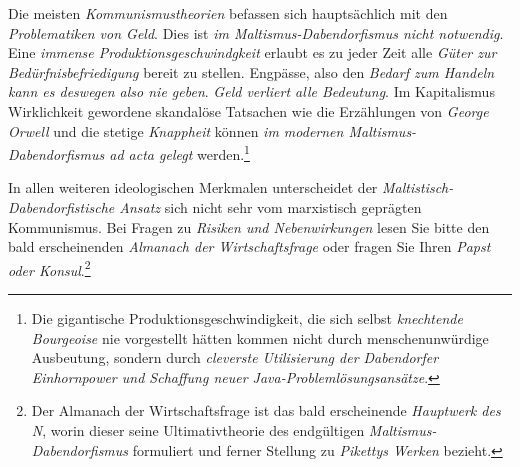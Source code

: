 \begin{itemize}
Die meisten \textit{Kommunismustheorien} befassen sich hauptsächlich mit den \textit{Problematiken von Geld}. Dies ist \textit{im Maltismus-Dabendorfismus nicht notwendig}. Eine \textit{immense Produktionsgeschwindgkeit} erlaubt es zu jeder Zeit alle \textit{Güter zur Bedürfnisbefriedigung} bereit zu stellen. Engpässe, also den \textit{Bedarf zum Handeln kann es deswegen also nie geben}. \textit{Geld verliert alle Bedeutung}. Im Kapitalismus Wirklichkeit gewordene skandalöse Tatsachen wie die Erzählungen von \textit{George Orwell} und die stetige \textit{Knappheit} können \textit{im modernen Maltismus-Dabendorfismus ad acta gelegt} werden.\footnote{Die gigantische Produktionsgeschwindigkeit, die sich selbst \textit{knechtende Bourgeoise} nie vorgestellt hätten kommen nicht durch menschenunwürdige Ausbeutung, sondern durch \textit{cleverste Utilisierung der Dabendorfer Einhornpower und Schaffung neuer Java-Problemlösungsansätze}.}
\end{itemize}
In allen weiteren ideologischen Merkmalen unterscheidet der \textit{Maltistisch-Dabendorfistische Ansatz} sich nicht sehr vom marxistisch geprägten Kommunismus. Bei Fragen zu \textit{Risiken und Nebenwirkungen} lesen Sie bitte den bald erscheinenden \textit{Almanach der Wirtschaftsfrage} oder fragen Sie Ihren \textit{Papst oder Konsul}.\footnote{Der Almanach der Wirtschaftsfrage ist das bald erscheinende \textit{Hauptwerk des N}, worin dieser seine \mbox{Ultimativtheorie} des endgültigen \textit{Maltismus-Dabendorfismus} formuliert und ferner Stellung zu \textit{\mbox{Pikettys} Werken} bezieht.}

